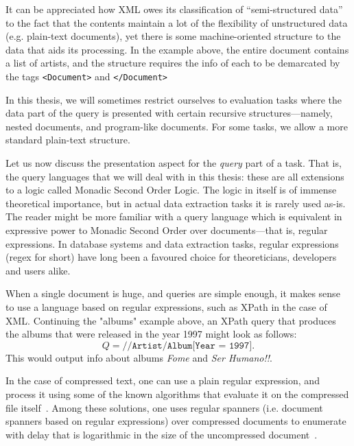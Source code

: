 It can be appreciated how XML owes its classification of ``semi-structured data'' to the fact that the contents maintain a lot of the flexibility of unstructured data (e.g. plain-text documents), yet there is some machine-oriented structure to the data that aids its processing. In the example above, the entire document contains a list of artists, and the structure requires  the info of each to be demarcated by the tags {\tt <Document>} and {\tt </Document>}


In this thesis, we will sometimes restrict ourselves to evaluation tasks where the data part of the query is presented with certain recursive structures---namely, nested documents, and program-like documents. For some tasks, we allow a more standard plain-text structure.

Let us now discuss the presentation aspect for the {\em query} part of a task. That is, the query languages that we will deal with in this thesis: these are all extensions to a logic called Monadic Second Order Logic. The logic in itself is of immense theoretical importance, but in actual data extraction tasks it is rarely used as-is. The reader might be more familiar with a query language which is equivalent in expressive power to Monadic Second Order over documents---that is, regular expressions. In database systems and data extraction tasks, regular expressions (regex for short) have long been a favoured choice for theoreticians, developers and users alike. 

When a single document is huge, and queries are simple enough, it makes sense to use a language based on regular expressions, such as XPath in the case of XML. 
Continuing the "albums" example above, an XPath query that produces the albums that were released in the year 1997 might look as follows: 
$$Q = \texttt{//Artist/Album[Year = 1997]}.$$
This would output info about albums {\it Fome} and {\it Ser Humano!!}.

In the case of compressed text, one can use a plain regular expression, and process it using some of the known algorithms that evaluate it on the compressed file itself~\cite{Lohrey12}. Among these solutions, one uses regular spanners (i.e. document spanners based on regular expressions) over compressed documents to enumerate with delay that is logarithmic in the size of the uncompressed document~\cite{SchmidS21}.

